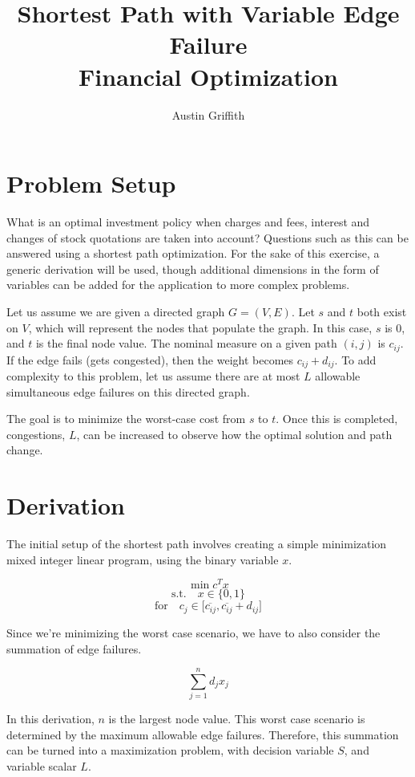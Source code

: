 \documentclass{article}
\title{Shortest Path with Variable Edge Failure \\ Financial Optimization}
\author{Austin Griffith}
\affil{Georgia Institute of Technology, Quantitative Finance}
\date{}
\begin{document}
	\maketitle

\section{Problem Setup}
What is an optimal investment policy when charges and fees, interest and changes of stock quotations are taken into account? Questions such as this can be answered using a shortest path optimization. For the sake of this exercise, a generic derivation will be used, though additional dimensions in the form of variables can be added for the application to more complex problems.

Let us assume we are given a directed graph $G = (V,E)$. Let $s$ and $t$ both exist on $V$, which will represent the nodes that populate the graph. In this case, $s$ is $0$, and $t$ is the final node value. The nominal measure on a given path $(i,j)$ is $c_{ij}$. If the edge fails (gets congested), then the weight becomes $c_{ij} + d_{ij}$. To add complexity to this problem, let us assume there are at most $L$ allowable simultaneous edge failures on this directed graph.

The goal is to minimize the worst-case cost from $s$ to $t$. Once this is completed, congestions, $L$, can be increased to observe how the optimal solution and path change.

\newpage
\section{Derivation}
The initial setup of the shortest path involves creating a simple minimization mixed integer linear program, using the binary variable $x$.

$$\min c^T x$$
$$
\textrm{s.t.} \quad x \in \{0,1\}
$$
$$
\textrm{for} \quad c_j \in \lbrack\overline{c_{ij}},\overline{c_{ij}} + d_{ij}\rbrack
$$

Since we're minimizing the worst case scenario, we have to also consider the summation of edge failures.

$$
\sum_{j=1}^{n}d_{j}x_{j}
$$

In this derivation, $n$ is the largest node value. This worst case scenario is determined by the maximum allowable edge failures. Therefore, this summation can be turned into a maximization problem, with decision variable $S$, and variable scalar $L$.
\end{document}

